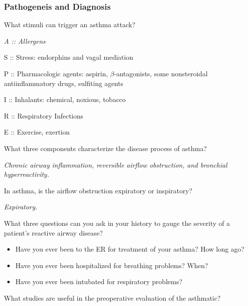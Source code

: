 \documentclass[11pt,letterpaper,draft]{exam}
\renewcommand{\SolutionEmphasis}{\itshape \small}
\begin{document}
\subsubsection*{Pathogeneis and Diagnosis}
\begin{questions}

\question What stimuli can trigger an asthma attack?

\begin{TheSolution}
\SolutionEmphasis
A :: Allergens

S :: Stress: endorphins and vagal mediation

P :: Pharmacologic agents:  aspirin, ${\beta}$-antagonists, some nonsteroidal antiinflammatory drugs, sulfiting agents

I :: Inhalants: chemical, noxious, tobacco

R :: Respiratory Infections

E :: Exercise, exertion
\end{TheSolution}

\question What three components characterize the disease process of asthma?

\begin{TheSolution}
\SolutionEmphasis Chronic airway inflammation, reversible airflow obstruction, and
bronchial hyperreactivity. 
\end{TheSolution}

\question In asthma, is the airflow obstruction expiratory or inspiratory?

\begin{TheSolution}
\SolutionEmphasis Expiratory.
\end{TheSolution}

\question What three questions can you ask in your history to gauge the severity of
a patient's reactive airway disease?

\begin{TheSolution}
\SolutionEmphasis
\begin{itemize}
\item Have you ever been to the ER for treatment of your asthma? How long ago?
\item Have you ever been hospitalized for breathing problems? When?
\item Have you ever been intubated for respiratory problems?
\end{itemize}
\end{TheSolution}

\question What studies are useful in the preoperative evaluation of the asthmatic?


\end{questions}
\end{document}
